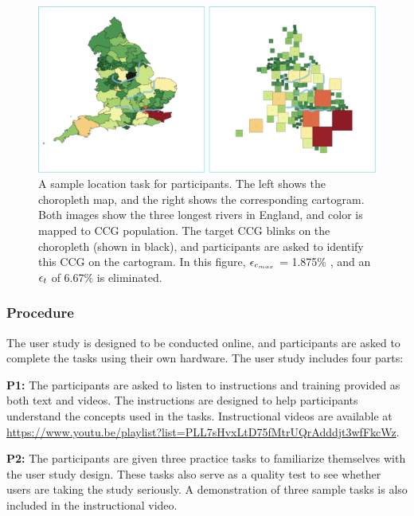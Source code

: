     {
        \begin{figure}[tb!]
            \centering
            \includegraphics[width=\columnwidth,keepaspectratio]{figure/evaluation/task.png}
            \caption{A sample location task for participants. The left shows the choropleth map, and the right shows the corresponding cartogram. Both images show the three longest rivers in England, and color is mapped to CCG population. The target CCG blinks on the choropleth (shown in black), and participants are asked to identify this CCG on the cartogram. In this figure, $ \epsilon_{c_{max}} $ = 1.875\% , and an $ \epsilon_{t} $ of 6.67\% is eliminated. }
            \label{fig:task}
        \end{figure}
    }

\subsubsection{Procedure}
\label{subsec:{Procedure}}

The user study is designed to be conducted online, and participants are asked to complete the tasks using their own hardware. The user study includes four parts:

\textbf{P1:} The participants are asked to listen to instructions and training provided as both text and videos. The instructions are designed to help participants understand the concepts used in the tasks. Instructional videos are available at \url{https://www.youtu.be/playlist?list=PLL7sHvxLtD75fMtrUQrAdddjt3wfFkcWz}.

\textbf{P2:} The participants are given three practice tasks to familiarize themselves with the user study design. These tasks also serve as a quality test to see whether users are taking the study seriously. A demonstration of three sample tasks is also included in the instructional video.

